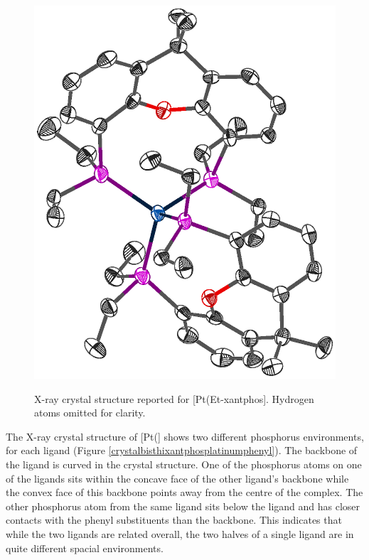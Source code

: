 \begin{figure}[htb]
\begin{center}
\vspace{0.5cm}
\includegraphics[scale=0.7]{../Othercrystals/Etxantphos.eps}
\caption[X-ray crystal structure reported for [Pt(Et-xantphos\ce{)2}{]}]{X-ray crystal structure reported for [Pt(Et-xantphos].  Hydrogen atoms omitted for clarity.\cite{Miedaner2004}}
\vspace{0.2cm}
\label{Etxantphos}
\end{center}
\end{figure}
\vspace{0.2cm}

The X-ray crystal structure of [Pt(\Phthixantphos{}] shows two different phosphorus environments, for each \Phthixantphos{} ligand (Figure \ref{crystalbisthixantphosplatinumphenyl}).  The backbone of the \Phthixantphos{} ligand is curved in the crystal structure.  One of the phosphorus atoms on one of the ligands sits within the concave face of the  other ligand's backbone while the convex face of this backbone points away from the centre of the complex.  The other phosphorus atom from the same ligand sits below the ligand and has closer contacts with the phenyl substituents than the backbone.  This indicates that while the two ligands are related overall, the two halves of a single ligand are in quite different spacial environments.  

